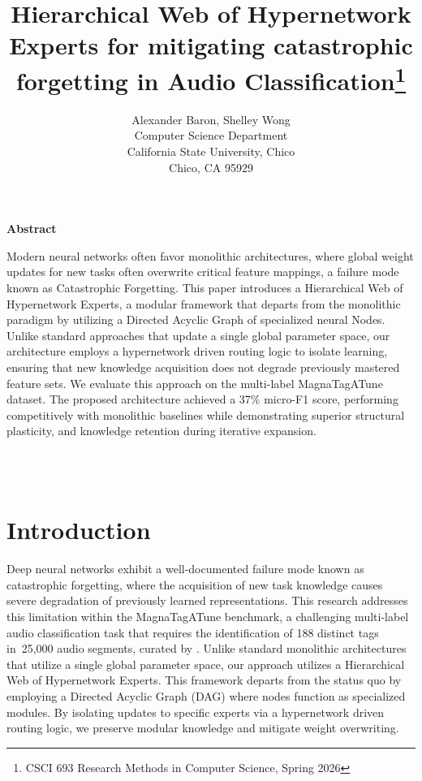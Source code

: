 \documentclass{article}
\title{Hierarchical Web of Hypernetwork Experts for mitigating catastrophic forgetting in Audio Classification\footnote{CSCI 693 Research Methods in Computer Science, Spring 2026}}
\author{
  Alexander Baron, Shelley Wong\\
  Computer Science Department\\
  California State University, Chico\\
  Chico, CA 95929\\
  \email{\{ajbaron,swong26\}@csuchico.edu}
}
\begin{document}
\maketitle

\begin{center}
    \begin{minipage}{0.7\textwidth}
        \begin{center}
            \begin{large}
                \textbf{Abstract}\\
            \end{large}
        \end{center}
Modern neural networks often favor monolithic architectures, where global weight updates for new tasks often overwrite critical feature mappings, a failure mode known as Catastrophic Forgetting. This paper introduces a Hierarchical Web of Hypernetwork Experts, a modular framework that departs from the monolithic paradigm by utilizing a Directed Acyclic Graph of specialized neural Nodes. Unlike standard approaches that update a single global parameter space, our architecture employs a hypernetwork driven routing logic to isolate learning, ensuring that new knowledge acquisition does not degrade previously mastered feature sets. We evaluate this approach on the multi-label MagnaTagATune dataset. The proposed architecture achieved a 37\% micro-F1 score, performing competitively with monolithic baselines while demonstrating superior structural plasticity, and knowledge retention during iterative expansion.
    \end{minipage}
\end{center}
\\\
\section{Introduction}
Deep neural networks exhibit a well-documented failure mode known as catastrophic forgetting, where the acquisition of new task knowledge causes severe degradation of previously learned representations. This research addresses this limitation within the MagnaTagATune benchmark, a challenging multi-label audio classification task that requires the identification of 188 distinct tags in~25,000 audio segments, curated by \textcite{MagnaTag}. Unlike standard monolithic architectures that utilize a single global parameter space, our approach utilizes a Hierarchical Web of Hypernetwork Experts. This framework departs from the status quo by employing a Directed Acyclic Graph (DAG) where nodes function as specialized modules. By isolating updates to specific experts via a hypernetwork driven routing logic, we preserve modular knowledge and mitigate weight overwriting.
\end{document}
